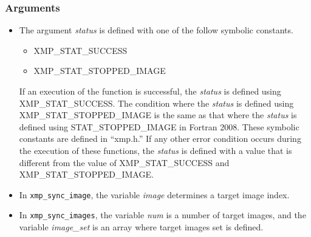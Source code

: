 \subsubsection*{Arguments}
\begin{itemize}
  \item The argument {\it status} is defined with one of the follow symbolic constants.
  \begin{itemize}
    \item XMP\_STAT\_SUCCESS
    \item XMP\_STAT\_STOPPED\_IMAGE
  \end{itemize}
  If an execution of the function is successful, the {\it status} is defined using XMP\_STAT\_SUCCESS.
  The condition where the {\it status} is defined using XMP\_STAT\_STOPPED\_IMAGE is the same as 
  that where the {\it status} is defined using STAT\_STOPPED\_IMAGE in Fortran 2008.
  These symbolic constants are defined in ``xmp.h.''
  If any other error condition occurs during the execution of these functions,
  the {\it status} is defined with a value that is different from the value of XMP\_STAT\_SUCCESS and
  XMP\_STAT\_STOPPED\_IMAGE.
  \item In {\tt xmp\_sync\_image}, the variable {\it image} determines a target image index.
  \item In {\tt xmp\_sync\_images}, the variable {\it num} is a number of target images, and 
        the variable {\it image\_set} is an array where target images set is defined.
\end{itemize}

